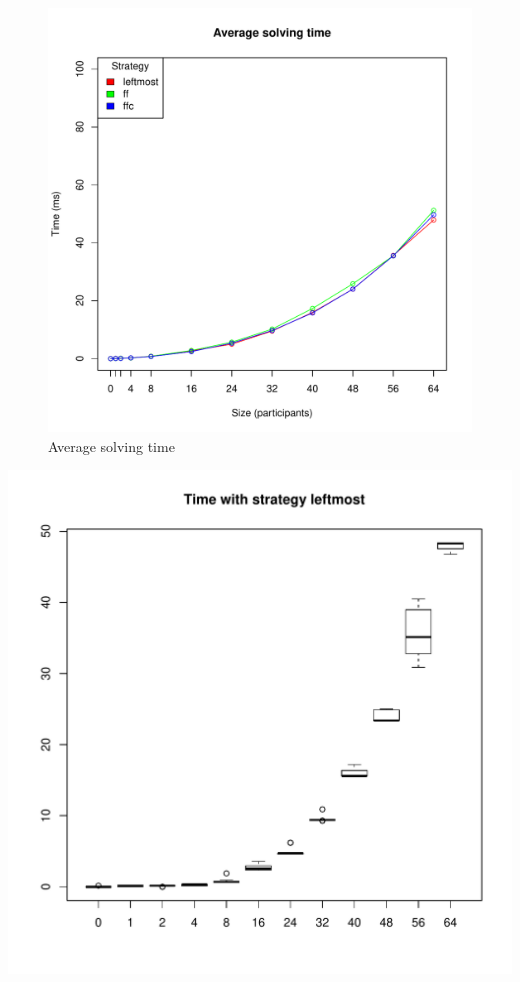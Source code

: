 \documentclass{article}
\begin{document}
\begin{figure}
\centering
\includegraphics[width=\linewidth]{time}
\caption{Average solving time}
\label{fig:time}
\end{figure}


\includegraphics[width=\linewidth]{leftmost_time}
\end{document}
